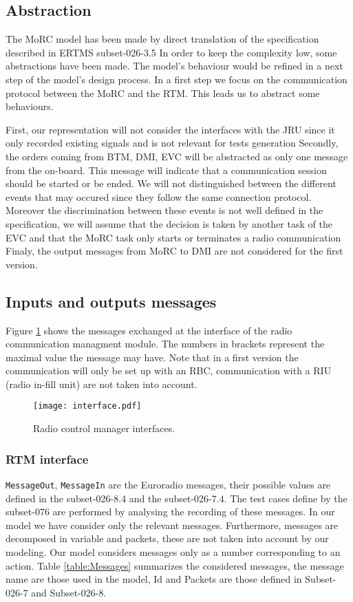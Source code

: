 \subsection{Abstraction}
\label{subsec:abstaction}
The MoRC model has been made by direct translation of the specification described
in ERTMS subset-026-3.5 In order to keep the complexity low, some
abstractions have been made. The model's behaviour would be refined in a next step
of the model's design process. In a first step we focus on the communication
protocol between the MoRC and the RTM. This leads us to abstract some behaviours.

First, our representation will not consider the interfaces with the JRU
since it only recorded existing signals and is not relevant for tests
generation
Secondly, the orders coming from BTM, DMI, EVC will be abstracted as only one message
from the on-board. This message will indicate that a communication session
should be started or be ended. We will not distinguished between the different
events that may occured since they follow the same connection protocol. Moreover the discrimination
between these events is not well defined in the specification, we will assume
that the decision is taken by another task of the EVC and that the MoRC task only
 starts or terminates a radio communication
Finaly, the output messages from MoRC to DMI are not considered for the first version.


\subsection{Inputs and outputs messages}
\label{subsec:inputoutput}

Figure \ref{fig:interfaces} shows the messages exchanged at the interface of
the radio communication managment module. The numbers in brackets represent the maximal value the message
may have. Note that in a first version the communication will only be set up
with an RBC, communication with a RIU (radio in-fill unit) are not taken
into account.

\begin{figure}[htpb]
\centering
\texttt{[image: interface.pdf]}
\caption{\label{fig:interfaces} Radio control manager interfaces.}
\end{figure}

\subsubsection{RTM interface}
\verb+MessageOut+, \verb+MessageIn+ are the Euroradio messages, their
possible values are defined in the subset-026-8.4 and the subset-026-7.4. The
test cases define by the subset-076 are performed by analysing the recording of
these messages. In our model we have consider only the relevant messages.
Furthermore, messages are decomposed in variable and packets, these are not
taken into account by our modeling. Our model considers messages only as a number corresponding to an action. 
Table \ref{table:Messages} summarizes the considered messages, the message name
are those used in the model, Id and Packets are those defined in Subset-026-7
and Subset-026-8.


